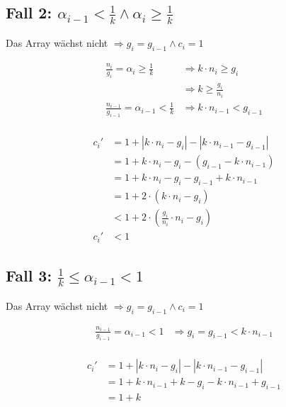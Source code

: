 \documentclass[parskip=half,a4paper]{scrartcl}
\begin{document}
\subsection*{Fall 2: $\alpha_{i-1} < \frac{1}{k} \land \alpha_i \ge \frac{1}{k}$}

Das Array wächst nicht
$\Rightarrow g_i = g_{i-1} \land c_i = 1$

\begin{equation}
\begin{aligned}
\frac{n_i}{g_i} = \alpha_i \ge \frac{1}{k} & \Rightarrow k \cdot n_i \ge g_i \\ &\Rightarrow k \ge \frac{g_i}{n_i}\\
\frac{n_{i-1}}{g_{i-1}} = \alpha_{i-1} < \frac{1}{k} & \Rightarrow k \cdot n_{i-1} < g_{i-1}\\
\end{aligned}
\end{equation}

\begin{equation}
\begin{aligned}
   c_i' &= 1 + \left|k \cdot n_i - g_i\right| - \left|k \cdot n_{i-1} - g_{i-1}\right|\\
   &= 1 + k \cdot n_i - g_i - \left(g_{i-1} - k \cdot n_{i-1}\right)\\
   &= 1 + k \cdot n_i - g_i - g_{i-1} + k \cdot n_{i-1}\\
   &= 1 + 2 \cdot \left(k\cdot n_i - g_i\right)\\
   &< 1 + 2 \cdot \left(\frac{g_i}{n_i} \cdot n_i - g_i\right)\\
   c_i' &< 1
\end{aligned}
\end{equation}


\subsection*{Fall 3: $\frac{1}{k} \le \alpha_{i-1} < 1$}

Das Array wächst nicht
$\Rightarrow g_i = g_{i-1} \land c_i = 1$

\begin{equation}
\begin{aligned}
\frac{n_{i-1}}{g_{i-1}} = \alpha_{i-1} < 1
& \Rightarrow g_i = g_{i-1} < k\cdot n_{i-1}\\
\end{aligned}
\end{equation}


\begin{equation}
\begin{aligned}
   c_i' &= 1 + \left|k \cdot n_i - g_i\right| - \left|k \cdot n_{i-1} - g_{i-1}\right|\\
   &= 1 + k \cdot n_{i-1} + k - g_i - k \cdot n_{i-1} + g_{i-1}\\
   &= 1 + k
\end{aligned}
\end{equation}
\end{document}
